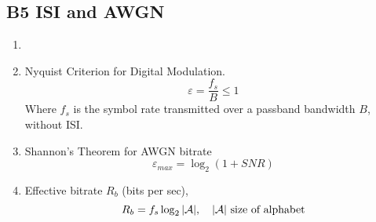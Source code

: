 \documentclass[../../main.tex]{subfiles}
\begin{document}
\newcommand{\pxf}{P_{\mathbf{X}}(f)}
\newcommand{\pyf}{P_{\mathbf{y}}(f)}
\newcommand{\hf}{\mathbf{H}(f)}
\newcommand{\xf}{\mathbf{X}(f)}
\newcommand{\yf}{\mathbf{Y}(f)}
\subsection{B5 ISI and AWGN}
\begin{wtr}
\begin{enumerate}
    \item[]
    \item Nyquist Criterion for Digital Modulation.
    \[
    \varepsilon=\dfrac{f_s}{B}\leq 1
    \]
    Where $f_s$ is the symbol rate transmitted over a passband bandwidth $B$, without ISI.
    \item Shannon's Theorem for AWGN bitrate
    \[
    \varepsilon_{max} = \log_2(1+SNR)
    \]
    \item Effective bitrate $R_b$ (bits per sec),
    \[
    R_b = f_s\log_2|\cal{A}|,\quad |\cal{A}| \text{ size of alphabet}
    \]
\end{enumerate}
    
\end{wtr}
\end{document}

